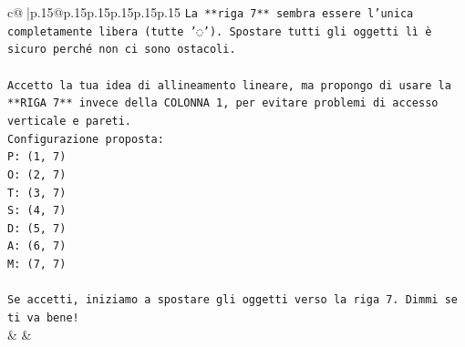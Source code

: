 \documentclass{article}
\begin{document}
{\begin{supertabular}{c@{$\;$}|p{.15\linewidth}@{}p{.15\linewidth}p{.15\linewidth}p{.15\linewidth}p{.15\linewidth}p{.15\linewidth}}
{{{\texttt{La **riga 7** sembra essere l'unica completamente libera (tutte '◌'). Spostare tutti gli oggetti lì è sicuro perché non ci sono ostacoli.} \\
\\ 
\texttt{Accetto la tua idea di allineamento lineare, ma propongo di usare la **RIGA 7** invece della COLONNA 1, per evitare problemi di accesso verticale e pareti.} \\
\texttt{Configurazione proposta:} \\
\texttt{P: (1, 7)} \\
\texttt{O: (2, 7)} \\
\texttt{T: (3, 7)} \\
\texttt{S: (4, 7)} \\
\texttt{D: (5, 7)} \\
\texttt{A: (6, 7)} \\
\texttt{M: (7, 7)} \\
\\ 
\texttt{Se accetti, iniziamo a spostare gli oggetti verso la riga 7. Dimmi se ti va bene!} \\
            }
        }
    }
    & & \\ \\


\end{supertabular}}
\end{document}
